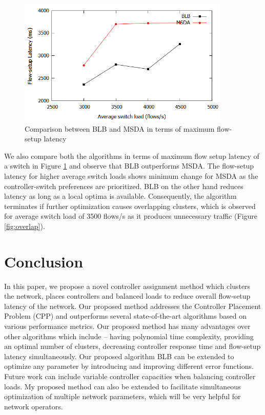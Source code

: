 \documentclass[preprint,12pt]{elsarticle}
\begin{document}
	\begin{figure}
		\centering
		\includegraphics[width=0.9\textwidth]{Images/omega_comparison.png}
		\caption{Comparison between BLB and MSDA in terms of maximum flow-setup latency} \label{fig:Ocomparison}
		\vspace{1cm}
	\end{figure}
	
	We also compare both the algorithms in terms of maximum flow setup latency of a switch in Figure \ref{fig:Ocomparison} and observe that BLB outperforms MSDA. The flow-setup latency for higher average switch loads shows minimum change for MSDA as the controller-switch preferences are prioritized. BLB on the other hand reduces latency as long as a local optima is available. Consequently, the algorithm terminates if further optimization causes overlapping clusters, which is observed for average switch load of 3500 flows/s as it produces unnecessary traffic (Figure \ref{fig:overlap}).
	
	\section{Conclusion} \label{conclusion}
	In this paper, we propose a novel controller assignment method which clusters the network, places controllers and balanced loads to reduce overall flow-setup latency of the network. Our proposed method addresses the Controller Placement Problem (CPP) and outperforms several state-of-the-art algorithms based on various performance metrics. Our proposed method has many advantages over other algorithms which include -- having polynomial time complexity, providing an optimal number of clusters, decreasing controller response time and flow-setup latency simultaneously. Our proposed algorithm BLB can be extended to optimize any parameter by introducing and improving different error functions. Future work can include variable controller capacities when balancing controller loads. My proposed method can also be extended to facilitate simultaneous optimization of multiple network parameters, which will be very helpful for network operators.
	
	 
	
\end{document}
